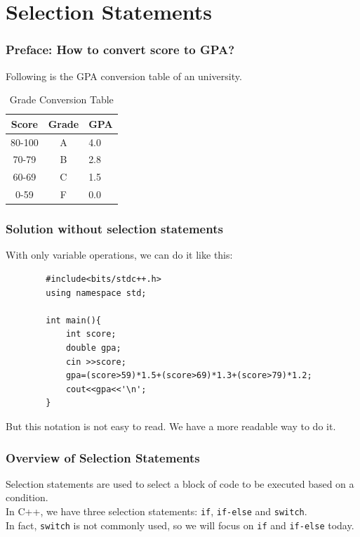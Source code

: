 \documentclass[xcolor=dvipsnames]{beamer}
\begin{document}
    \section{Selection Statements}
    \begin{frame}
        \frametitle{Preface: How to convert score to GPA?}
        Following is the GPA conversion table of an university.
        \begin{table}
            \centering
            \begin{tabular}{ccl}
                \toprule
                Score & Grade & GPA \\
                \midrule
                80-100 & A & 4.0 \\
                70-79 & B & 2.8 \\
                60-69 & C & 1.5 \\
                0-59 & F & 0.0 \\
                \bottomrule
            \end{tabular}
            \caption{Grade Conversion Table}
        \end{table}
    \end{frame}
    \begin{frame}[fragile]
        \frametitle{Solution without selection statements}
        With only variable operations, we can do it like this:
        \begin{verbatim}
        #include<bits/stdc++.h>
        using namespace std;

        int main(){
            int score;
            double gpa;
            cin >>score;
            gpa=(score>59)*1.5+(score>69)*1.3+(score>79)*1.2;
            cout<<gpa<<'\n';
        }            
        \end{verbatim}
        But this notation is not easy to read. We have a more readable way to do it.
    \end{frame}
    \begin{frame}
        \frametitle{Overview of Selection Statements}
        Selection statements are used to select a block of code to be executed based on a condition.\\
        In C++, we have three selection statements: \texttt{if}, \texttt{if-else} and \texttt{switch}.\\
        In fact, \texttt{switch} is not commonly used, so we will focus on \texttt{if} and \texttt{if-else} today.
    \end{frame}
\end{document}
